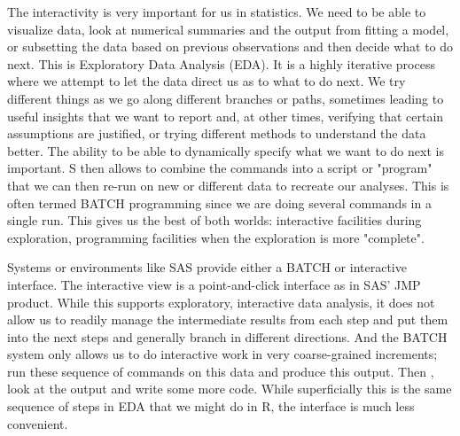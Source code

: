  The interactivity is very important for us in statistics. We need to be able to visualize data, look at numerical summaries and the output from fitting a model, or subsetting the data based on previous observations and then decide what to do next. This is Exploratory Data Analysis (EDA). It is a highly iterative process where we attempt to let the data direct us as to what to do next. We try different things as we go along different branches or paths, sometimes leading to useful insights that we want to report and, at other times, verifying that certain assumptions are justified, or trying different methods to understand the data better. The ability to be able to dynamically specify what we want to do next is important. S then allows to combine the commands into a script or "program" that we can then re-run on new or different data to recreate our analyses. This is often termed BATCH programming since we are doing several commands in a single run. This gives us the best of both worlds: interactive facilities during exploration, programming facilities when the exploration is more "complete". 

 Systems or environments like SAS provide either a BATCH or interactive interface. The interactive view is a point-and-click interface as in SAS' JMP product. While this supports exploratory, interactive data analysis, it does not allow us to readily manage the intermediate results from each step and put them into the next steps and generally branch in different directions. And the BATCH system only allows us to do interactive work in very coarse-grained increments; run these sequence of commands on this data and produce this output. Then , look at the output and write some more code. While superficially this is the same sequence of steps in EDA that we might do in R, the interface is much less convenient. 

